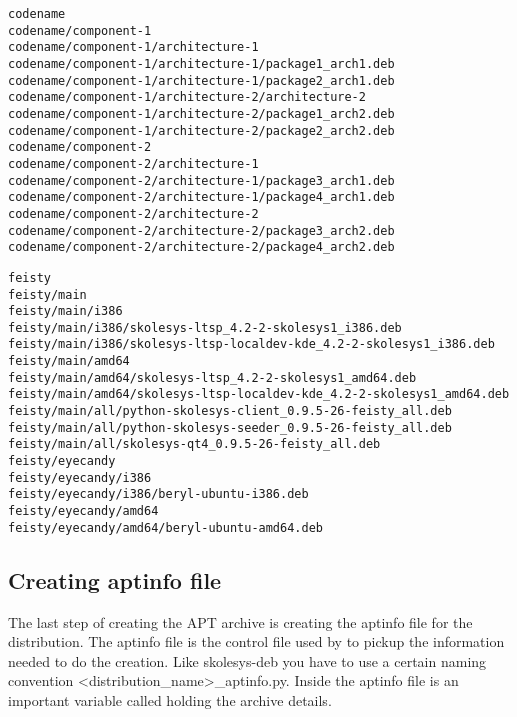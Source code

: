 \begin{verbatim}
codename
codename/component-1
codename/component-1/architecture-1
codename/component-1/architecture-1/package1_arch1.deb
codename/component-1/architecture-1/package2_arch1.deb
codename/component-1/architecture-2/architecture-2
codename/component-1/architecture-2/package1_arch2.deb
codename/component-1/architecture-2/package2_arch2.deb
codename/component-2
codename/component-2/architecture-1
codename/component-2/architecture-1/package3_arch1.deb
codename/component-2/architecture-1/package4_arch1.deb
codename/component-2/architecture-2
codename/component-2/architecture-2/package3_arch2.deb
codename/component-2/architecture-2/package4_arch2.deb
\end{verbatim}

\begin{verbatim}
feisty
feisty/main
feisty/main/i386
feisty/main/i386/skolesys-ltsp_4.2-2-skolesys1_i386.deb
feisty/main/i386/skolesys-ltsp-localdev-kde_4.2-2-skolesys1_i386.deb
feisty/main/amd64
feisty/main/amd64/skolesys-ltsp_4.2-2-skolesys1_amd64.deb
feisty/main/amd64/skolesys-ltsp-localdev-kde_4.2-2-skolesys1_amd64.deb
feisty/main/all/python-skolesys-client_0.9.5-26-feisty_all.deb
feisty/main/all/python-skolesys-seeder_0.9.5-26-feisty_all.deb
feisty/main/all/skolesys-qt4_0.9.5-26-feisty_all.deb
feisty/eyecandy
feisty/eyecandy/i386
feisty/eyecandy/i386/beryl-ubuntu-i386.deb
feisty/eyecandy/amd64
feisty/eyecandy/amd64/beryl-ubuntu-amd64.deb
\end{verbatim}

\subsection{Creating aptinfo file\label{skolesys-apt-aptinfo}}
The last step of creating the APT archive is creating the aptinfo file for the distribution. The aptinfo file is the control file used by  to pickup the information needed to do the creation. Like skolesys-deb you have to use a certain naming convention <distribution_name>_aptinfo.py. Inside the aptinfo file is an important variable called  holding the archive details. 



